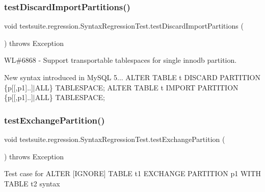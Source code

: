 \subsubsection{\texorpdfstring{test\+Discard\+Import\+Partitions()}{testDiscardImportPartitions()}}
{\footnotesize\ttfamily void testsuite.\+regression.\+Syntax\+Regression\+Test.\+test\+Discard\+Import\+Partitions (\begin{DoxyParamCaption}{ }\end{DoxyParamCaption}) throws Exception}

WL\#6868 -\/ Support transportable tablespaces for single innodb partition.

New syntax introduced in My\+S\+QL 5... A\+L\+T\+ER T\+A\+B\+LE t D\+I\+S\+C\+A\+RD P\+A\+R\+T\+I\+T\+I\+ON \{p\mbox{[}\mbox{[},p1\mbox{]}..\mbox{]}$\vert$\+A\+LL\} T\+A\+B\+L\+E\+S\+P\+A\+CE; A\+L\+T\+ER T\+A\+B\+LE t I\+M\+P\+O\+RT P\+A\+R\+T\+I\+T\+I\+ON \{p\mbox{[}\mbox{[},p1\mbox{]}..\mbox{]}$\vert$\+A\+LL\} T\+A\+B\+L\+E\+S\+P\+A\+CE; \mbox{\label{classtestsuite_1_1regression_1_1_syntax_regression_test_a27af4a565f65e6f33db3e05e87a2035a}} 
\subsubsection{\texorpdfstring{test\+Exchange\+Partition()}{testExchangePartition()}}
{\footnotesize\ttfamily void testsuite.\+regression.\+Syntax\+Regression\+Test.\+test\+Exchange\+Partition (\begin{DoxyParamCaption}{ }\end{DoxyParamCaption}) throws Exception}

Test case for A\+L\+T\+ER \mbox{[}I\+G\+N\+O\+RE\mbox{]} T\+A\+B\+LE t1 E\+X\+C\+H\+A\+N\+GE P\+A\+R\+T\+I\+T\+I\+ON p1 W\+I\+TH T\+A\+B\+LE t2 syntax


